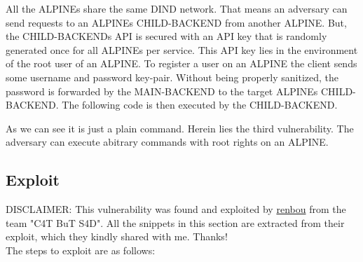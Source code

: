 \documentclass[10pt]{article}
\begin{document}
All the ALPINEs share the same DIND network. That means an adversary can send requests to an ALPINEs CHILD-BACKEND from another ALPINE. But, the CHILD-BACKENDs API is secured with an API key that is randomly generated once for all ALPINEs per service. This API key lies in the environment of the root user of an ALPINE. To register a user on an ALPINE the client sends some username and password key-pair. Without being properly sanitized, the password is forwarded by the MAIN-BACKEND to the target ALPINEs CHILD-BACKEND. The following code is then executed by the CHILD-BACKEND.



As we can see it is just a plain  command. Herein lies the third vulnerability. The adversary can execute abitrary  commands with root rights on an ALPINE.

\subsection{Exploit}

DISCLAIMER: This vulnerability was found and exploited by \href{https://ctftime.org/user/65650}{renbou} from the team "C4T BuT S4D". All the snippets in this section are extracted from their exploit, which they kindly shared with me. Thanks! \\

The steps to exploit are as follows:
\end{document}
